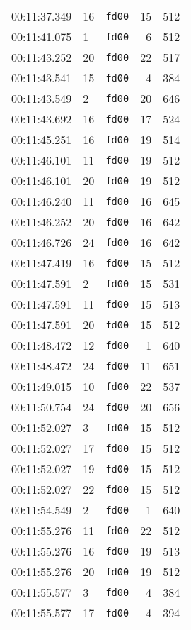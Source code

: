 \documentclass{article}
\begin{document}
\begin{longtable}{lllrr}
00:11:37.349 & 16 & \texttt{fd00} & 15 & 512 \\
00:11:41.075 & 1 & \texttt{fd00} & 6 & 512 \\
00:11:43.252 & 20 & \texttt{fd00} & 22 & 517 \\
00:11:43.541 & 15 & \texttt{fd00} & 4 & 384 \\
00:11:43.549 & 2 & \texttt{fd00} & 20 & 646 \\
00:11:43.692 & 16 & \texttt{fd00} & 17 & 524 \\
00:11:45.251 & 16 & \texttt{fd00} & 19 & 514 \\
00:11:46.101 & 11 & \texttt{fd00} & 19 & 512 \\
00:11:46.101 & 20 & \texttt{fd00} & 19 & 512 \\
00:11:46.240 & 11 & \texttt{fd00} & 16 & 645 \\
00:11:46.252 & 20 & \texttt{fd00} & 16 & 642 \\
00:11:46.726 & 24 & \texttt{fd00} & 16 & 642 \\
00:11:47.419 & 16 & \texttt{fd00} & 15 & 512 \\
00:11:47.591 & 2 & \texttt{fd00} & 15 & 531 \\
00:11:47.591 & 11 & \texttt{fd00} & 15 & 513 \\
00:11:47.591 & 20 & \texttt{fd00} & 15 & 512 \\
00:11:48.472 & 12 & \texttt{fd00} & 1 & 640 \\
00:11:48.472 & 24 & \texttt{fd00} & 11 & 651 \\
00:11:49.015 & 10 & \texttt{fd00} & 22 & 537 \\
00:11:50.754 & 24 & \texttt{fd00} & 20 & 656 \\
00:11:52.027 & 3 & \texttt{fd00} & 15 & 512 \\
00:11:52.027 & 17 & \texttt{fd00} & 15 & 512 \\
00:11:52.027 & 19 & \texttt{fd00} & 15 & 512 \\
00:11:52.027 & 22 & \texttt{fd00} & 15 & 512 \\
00:11:54.549 & 2 & \texttt{fd00} & 1 & 640 \\
00:11:55.276 & 11 & \texttt{fd00} & 22 & 512 \\
00:11:55.276 & 16 & \texttt{fd00} & 19 & 513 \\
00:11:55.276 & 20 & \texttt{fd00} & 19 & 512 \\
00:11:55.577 & 3 & \texttt{fd00} & 4 & 384 \\
00:11:55.577 & 17 & \texttt{fd00} & 4 & 394 \\

\end{longtable}
\end{document}
